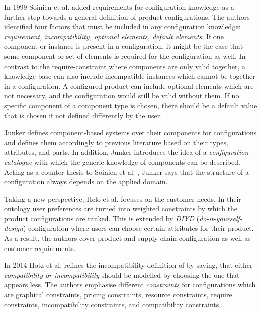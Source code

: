 In 1999 Soinien et al. \cite{soinie99a} added requirements for configuration knowledge as a further step towards a general definition of product configurations. The authors identified four factors that must be included in any configuration knowledge: \textit{requirement, incompatibility, optional elements, default elements}. If one component or instance is present in a configuration, it might be the case that some component or set of elements is required for the configuration as well. In contrast to the require-constraint where components are only valid together, a knowledge base can also include incompatible instances which cannot be together in a configuration. A configured product can include optional elements which are not necessary, and the configuration would still be valid without them. If no specific component of a component type is chosen, there should be a default value that is chosen if not defined differently by the user. \newline

Junker \cite{junker06a} defines component-based systems over their components for configurations and defines them accordingly to previous literature based on their types, attributes, and parts. In addition, Junker introduces the idea of a \textit{configuration catalogue} with which the generic knowledge of components can be described. Acting as a counter thesis to Soinien et al. \cite{sotimasu98a}, Junker says that the structure of a configuration always depends on the applied domain. \newline

Taking a new perspective, Helo et al. \cite{hexukyji10a} focuses on the customer needs. In their ontology user preferences are turned into weighted constraints by which the product configurations are ranked. This is extended by \textit{DIYD} (\textit{do-it-yourself-design}) configuration where users can choose certain attributes for their product. As a result, the authors cover product and supply chain configuration as well as customer requirements. \newline

In 2014 Hotz et al.\cite{hofestrybawo14a} refines the incompatibility-definition of \cite{soinie99a} by saying, that either \textit{compatibility or incompatibility} should be modelled by choosing the one that appears less. The authors emphasise different \textit{constraints} for configurations which are graphical constraints, pricing constraints, resource constraints, require constraints, incompatibility constraints, and compatibility constraints. \newline

